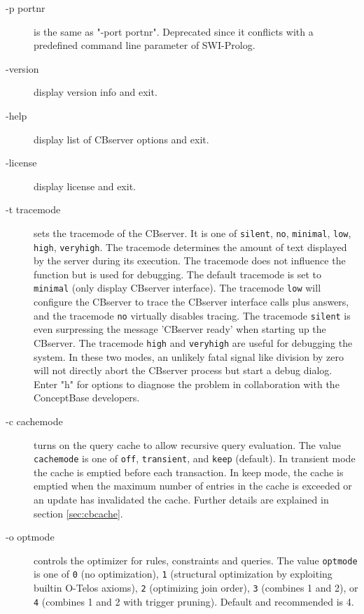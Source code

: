 \begin{description}
\item[-p portnr] is the same as "-port portnr". Deprecated since it conflicts with
a predefined command line parameter of SWI-Prolog.


\item[-version] display version info and exit.

\item[-help] display list of CBserver options and exit.

\item[-license] display license and exit.

\item[-t tracemode] sets the tracemode of the CBserver.
It is one of {\tt silent}, {\tt no}, {\tt minimal}, {\tt low}, {\tt high}, {\tt veryhigh}. The tracemode
determines the amount of text displayed by the server during its execution.
The tracemode does not influence the function but is used for debugging. The
default tracemode is set to {\tt minimal} (only display CBserver interface).
The tracemode {\tt low} will configure the CBserver to trace the CBserver interface
calls plus answers, and the tracemode {\tt no} virtually disables tracing.
The tracemode {\tt silent} is even surpressing the message 'CBserver ready' when starting up
the CBserver.
The tracemode {\tt high} and {\tt veryhigh} are useful for debugging the system.
In these two modes, an unlikely fatal signal like division by zero will not directly abort the
CBserver process but start a debug dialog. Enter "h" for options to
diagnose the problem in collaboration with the ConceptBase developers.

\item[-c cachemode] turns on the query cache to allow recursive query evaluation.
The value {\tt cachemode} is one of {\tt off}, {\tt transient}, and {\tt keep} (default).
In transient mode the cache is emptied before each transaction. In keep mode,
the cache is emptied when the maximum number of entries in the cache is exceeded
or an update has invalidated the cache. Further details are explained in section \ref{sec:cbcache}.

\item[-o optmode] controls the optimizer for rules, constraints and queries.
The value {\tt optmode} is one of {\tt 0} (no optimization), {\tt 1}
(structural optimization by exploiting builtin O-Telos axioms),
{\tt 2} (optimizing join order), {\tt 3} (combines 1 and 2), or
{\tt 4} (combines 1 and 2 with trigger pruning). Default
and recommended is 4.


\end{description}
